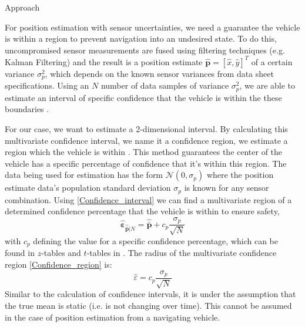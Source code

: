 \begin{section}{Approach}
	
For position estimation with sensor uncertainties, we need a guarantee the vehicle is within a region to prevent navigation into an undesired state. To do this,  uncompromised sensor measurements are fused using filtering techniques (e.g. Kalman Filtering) and the result is a position estimate $\hat{\bm{p}}=[\hat{x},\hat{y}]^T$ of a certain variance $\sigma_p^2$, which depends on the known sensor variances from data sheet specifications. Using an $N$ number of data samples of variance $\sigma_p^2$, we are able to estimate an interval of specific confidence that the vehicle is within the these boundaries .

For our case, we want to estimate a 2-dimensional interval. By calculating this multivariate confidence interval, we name it a confidence region, we estimate a region which the vehicle is within  . This method guarantees the center of the vehicle has a specific percentage of confidence that it's within this region. The data being used for estimation has the form $\mathcal{N}(0,\sigma_p)$ where the position estimate data's population standard deviation $\sigma_p$ is known for any sensor combination. Using \eqref{Confidence_interval} we can find a multivariate region of a determined confidence percentage that the vehicle is within to ensure safety,
    \begin{equation}
    \label{Confidence_region}
		\hat{\bm{\varepsilon}}_{\hat{\bar{\bm{p}}}|N} = \hat{\bar{\bm{p}}} + c_p\frac{\sigma_p}{\sqrt{N}}
	\end{equation}
with $c_p$ defining the value for a specific confidence percentage, which can be found in $z$-tables and $t$-tables in \cite{devore2011probability}. The radius of the multivariate confidence region \eqref{Confidence_region} is:
    \begin{equation}
		\hat{\varepsilon} = c_p\frac{\sigma_p}{\sqrt{N}}
	\end{equation}
Similar to the calculation of confidence intervals, it is under the assumption that the true mean is static (i.e. is not changing over time). This cannot be assumed in the case of position estimation from a navigating vehicle. 


\end{section}
